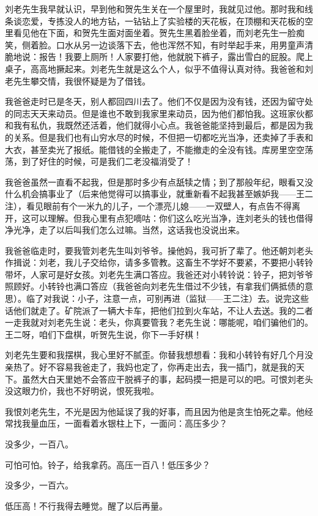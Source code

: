 刘老先生我早就认识，早到他和贺先生关在一个屋里时，我就见过他。那时我和线条谈恋爱，专拣没人的地方钻，一钻钻上了实验楼的天花板，在顶棚和天花板的空里看见他在下面，和贺先生面对面坐着。贺先生黑着脸坐着，而刘老先生一脸痴笑，侧着脸。口水从另一边谈落下去，他也浑然不知，有时举起手来，用男童声清脆地说：报告！我要上厕所！人家要打他，他就脱下裤子，露出雪白的屁股。爬上桌子，高高地撅起来。刘老先生就是这么个人，似乎不值得认真对待。我爸爸和刘老先生攀交情，我很怀疑是为了借钱。 

我爸爸走时已是冬天，别人都回四川去了。他们不仅是因为没有钱，还因为留守处的同志天天来动员。但是谁也不敢到我家里来动员，因为他们都怕我。这班家伙都和我有私仇，我既然还活着，他们就得小心点。我爸爸能坚持到最后，都是因为我的关系。但是我们也有山穷水尽的时候，不但把一切都吃光当净，还卖掉了手表和大衣，甚至卖光了报纸。能借钱的全搬走了，不能撤走的全没有钱。库房里空空荡荡，到了好住的时候，可是我们二老没福消受了！ 

我爸爸虽然一直看不起我，但是那时多少有点舐犊之情；到了那般年纪，眼看又没什么机会搞事业了（后来他觉得可以搞事业，就重新看不起我甚至嫉妒我——王二注），看见眼前有个一米九的儿子，一个漂亮儿媳——一双壁人，有点告不得离开，这可以理解。但我心里有点犯嘀咕：你们这么吃光当净，连刘老头的钱也借得净光净，走了以后叫我们怎么过嘛。当然，这话我也没说出来。 


我爸爸临走时，要我管刘老先生叫刘爷爷。操他妈，我可折了辈了。他还朝刘老头作揖说：刘老，我儿子交给你，请多多管教。这畜生不学好不要紧，不要把小转铃带坏，人家可是好女孩。刘老先生满口答应。我爸还对小转铃说：铃子，把刘爷爷照顾好。小转铃也满口答应（我爸爸向刘老先生借过不少钱，有拿我们俩抵债的意思）。临了对我说：小子，注意一点，可别再进（监狱——王二注）去。说完这些话他们就走了。矿院派了一辆大卡车，把他们拉到火车站，不让人去送。我的二者一走我就对刘老先生说：老头，你真要管我？老先生说：哪能呢，咱们骗他们的。王二呀，咱们下盘棋，听贺先生说，你下一手好棋！ 

刘老先生要和我摆棋，我心里好不腻歪。你替我想想看：我和小转铃有好几个月没亲热了。好不容易我爸走了，我妈也定了，你再走出去，我一插门，就是我的天下。虽然大白天里她不会答应干脱裤子的事，起码摸一把是可以的吧。可恨刘老头没这眼力价，我也不好明说，恨死我啦。 

我恨刘老先生，不光是因为他延误了我的好事，而且因为他是贪生怕死之辈。他经常找我量血压，一面看着水银柱上下，一面问：高压多少？ 

没多少，一百八。 

可怕可怕。铃子，给我拿药。高压一百八！低压多少？ 

没多少，一百六。 

低压高！不行我得去睡觉。醒了以后再量。 

